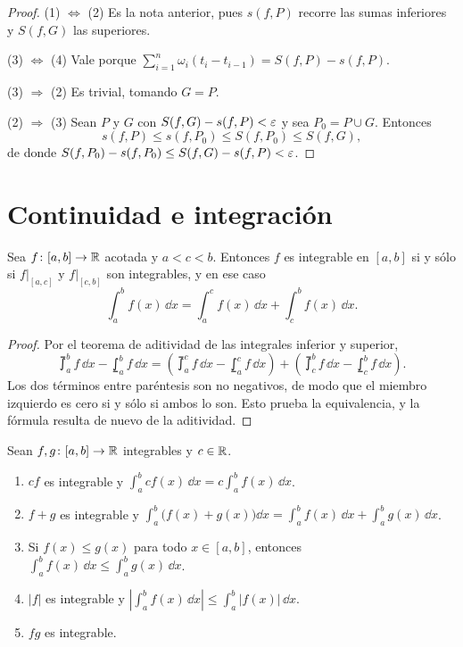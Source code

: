 \begin{proof}
  (1) \(\Leftrightarrow\) (2) Es la nota anterior, pues \(s(f, P)\) recorre las sumas inferiores y \(S(f, G)\) las superiores.

  (3) \(\Leftrightarrow\) (4) Vale porque \(\sum_{i=1}^{n} \omega_i (t_i - t_{i-1}) = S(f, P) - s(f, P)\).

  (3) \(\Rightarrow\) (2) Es trivial, tomando \(G = P\).

  (2) \(\Rightarrow\) (3) Sean \(P\) y \(G\) con \(S(f, G) - s(f, P) < \varepsilon\) y sea \(P_0 = P \cup G\). Entonces
  \[
    s(f, P) \leq s(f, P_0) \leq S(f, P_0) \leq S(f, G),
  \]
  de donde \(S(f, P_0) - s(f, P_0) \leq S(f, G) - s(f, P) < \varepsilon\).
\end{proof}

\section{Continuidad e integración}

\begin{theorem}
  Sea \(f\colon [a, b] \to \mathbb{R}\) acotada y \(a < c < b\). Entonces \(f\) es integrable en \([a, b]\) si y sólo si \(f|_{[a, c]}\) y \(f|_{[c, b]}\) son integrables, y en ese caso
  \[
    \int_a^b f(x) \,\dd x = \int_a^c f(x) \,\dd x + \int_c^b f(x) \,\dd x.
  \]
\end{theorem}

\begin{proof}
  Por el teorema de aditividad de las integrales inferior y superior,
  \[
    \upint_a^b f \,\dd x - \lowint_a^b f \,\dd x = \left( \upint_a^c f \,\dd x - \lowint_a^c f \,\dd x \right) + \left( \upint_c^b f \,\dd x - \lowint_c^b f \,\dd x \right).
  \]
  Los dos términos entre paréntesis son no negativos, de modo que el miembro izquierdo es cero si y sólo si ambos lo son. Esto prueba la equivalencia, y la fórmula resulta de nuevo de la aditividad.
\end{proof}

\begin{theorem}
  Sean \(f, g\colon [a, b] \to \mathbb{R}\) integrables y \(c \in \mathbb{R}\).
  \begin{enumerate}[label=(\arabic*)]
    \item \(c f\) es integrable y \(\int_a^b c f(x) \,\dd x = c \int_a^b f(x) \,\dd x\).
    \item \(f + g\) es integrable y \(\int_a^b \bigl( f(x) + g(x) \bigr) \dd x = \int_a^b f(x) \,\dd x + \int_a^b g(x) \,\dd x\).
    \item Si \(f(x) \leq g(x)\) para todo \(x \in [a, b]\), entonces \(\int_a^b f(x) \,\dd x \leq \int_a^b g(x) \,\dd x\).
    \item \(|f|\) es integrable y \(\left| \int_a^b f(x) \,\dd x \right| \leq \int_a^b |f(x)| \,\dd x\).
    \item \(f g\) es integrable.
  \end{enumerate}
\end{theorem}

